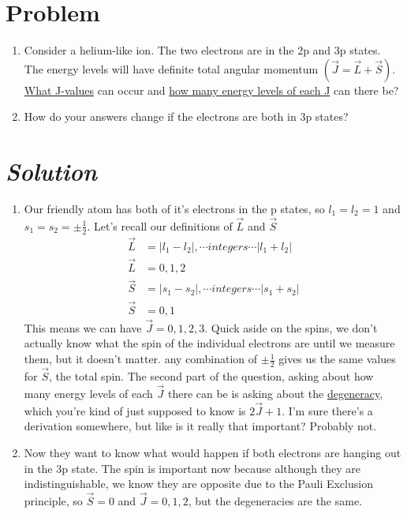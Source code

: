 \documentclass{article}
\begin{document}
\section*{Problem } 
\begin{enumerate}[label=\alph*)]
	\item Consider a helium-like ion. The two electrons are in the 2p and 3p states. The energy levels will have definite total angular momentum $(\vec{J} = \vec{L} + \vec{S})$. \underline{What J-values} can occur and \underline{how many energy levels of each J} can there be?
	\item How do your answers change if the electrons are both in 3p states?
\end{enumerate}
\section*{\textit{Solution}} 
\begin{enumerate}[label=\alph*)]
	\item Our friendly atom has both of it's electrons in the p states, so $l_1 = l_2 = 1$ and $s_1 = s_2 = \pm \frac{1}{2}$. Let's recall our definitions of $\vec{L}$ and $\vec{S}$
	\begin{align}
	\vec{L} &= |l_1- l_2|, \cdots integers \cdots |l_1 + l_2| \\ 
	\vec{L} &= 0, 1, 2 \\ 
	\vec{S} &= |s_1- s_2|, \cdots integers \cdots |s_1 + s_2| \\ 
	\vec{S} &= 0, 1
	\end{align}
This means we can have $\boxed{\vec{J} = 0, 1, 2, 3}$. Quick aside on the spins, we don't actually know what the spin of the individual electrons are until we measure them, but it doesn't matter. any combination of $\pm\frac{1}{2}$ gives us the same values for $\vec{S}$, the total spin. The second part of the question, asking about how many energy levels of each $\vec{J}$ there can be is asking about the \underline{degeneracy}, which you're kind of just supposed to know is $2\vec{J} +1$. I'm sure there's a derivation somewhere, but like is it really that important? Probably not.

\item Now they want to know what would happen if both electrons are hanging out in the 3p state. The spin is important now because although they are indistinguishable, we know they are opposite due to the Pauli Exclusion principle, so $\vec{S} = 0$ and $\boxed{\vec{J} = 0, 1, 2}$, but the degeneracies are the same.
	
\end{enumerate}
\end{document}

